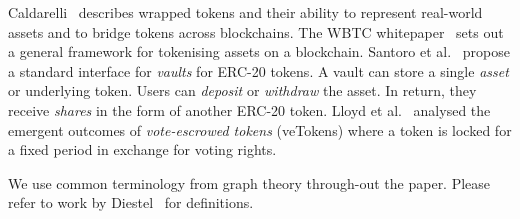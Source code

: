Caldarelli~\cite{caldarelli-21} describes wrapped tokens and their
ability to represent real-world assets and to bridge tokens across
blockchains.  The WBTC whitepaper~\cite{kyber-et-al-xx} sets out a
general framework for tokenising assets on a blockchain.  Santoro et
al.~\cite{santoro-et-al-22} propose a standard interface for
\textit{vaults} for ERC-20 tokens.  A vault can store a single
\textit{asset} or underlying token.  Users can \textit{deposit} or
\textit{withdraw} the asset.  In return, they receive \textit{shares}
in the form of another ERC-20 token.  Lloyd et
al.~\cite{lloyd-et-al-23} analysed the emergent outcomes of
\textit{vote-escrowed tokens} (veTokens) where a token is locked for a
fixed period in exchange for voting rights.

We use common terminology from graph theory through-out the paper.
Please refer to work by Diestel~\cite{diestel-17} for definitions.
